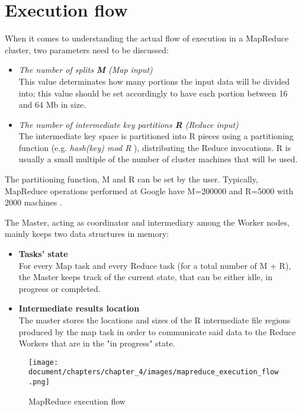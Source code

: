 \section{Execution flow}
When it comes to understanding the actual flow of execution in a MapReduce cluster, two parameters need to be discussed:
\begin{itemize}
    \item \textit{The number of splits \textbf{M} (Map input)}\\
    This value determinates how many portions the input data will be divided into; this value should be set accordingly to have each portion between 16 and 64 Mb in size.
    \item \textit{The number of intermediate key partitions \textbf{R} (Reduce input)}\\
    The intermediate key space is partitioned into R pieces using a partitioning function (e.g. \textit{hash(key) mod R} \cite{google_mapreduce}), distributing the Reduce invocations. R is usually a small multiple of the number of cluster machines that will be used.
\end{itemize}
The partitioning function, M and R can be set by the user. Typically, MapReduce operations performed at Google have M=200000 and R=5000 with 2000 machines \cite{google_mapreduce}.

The Master, acting as coordinator and intermediary among the Worker nodes, mainly keeps two data structures in memory:
\begin{itemize}
    \item \textbf{Tasks' state}\\
    For every Map task and every Reduce task (for a total number of M + R), the Master keeps track of the current state, that can be either idle, in progress or completed.
    \item \textbf{Intermediate results location}\\
    The master stores the locations and sizes of the R intermediate file regions produced by the map task in order to communicate said data to the Reduce Workers that are in the "in progress" state.
\end{itemize}

\begin{figure}[!ht]
    \centering
    \texttt{[image: document/chapters/chapter\_4/images/mapreduce\_execution\_flow.png]}
    \caption{MapReduce execution flow \cite{google_mapreduce}}
    \label{fig:mapreduce_execution_flow}
\end{figure}

